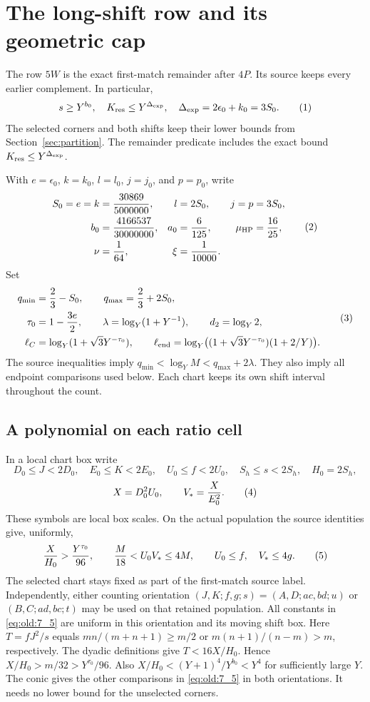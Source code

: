 \section{The long-shift row and its geometric cap}\label{sec:long}

The row \(5W\) is the exact first-match remainder after \(4P\). Its source
keeps every earlier complement. In particular,
\[
 s\ge Y^{b_0},\quad K_{\rm res}\le Y^{\Delta_{\rm exp}},\quad
 \Delta_{\rm exp}=2\epsilon_0+k_0=3S_0.
\AutoTag{eq:old:7_1}
\]
The selected corners and both shifts keep their lower bounds from
Section~\ref{sec:partition}. The remainder predicate includes the exact
bound \(K_{\rm res}\le Y^{\Delta_{\rm exp}}\).

With \(e=\epsilon_0\), \(k=k_0\), \(l=l_0\), \(j=j_0\), and \(p=p_0\), write
\[
\begin{aligned}
 S_0=e=k&=\frac{30869}{5000000},&
 l&=2S_0,& j=p&=3S_0,\\
 b_0&=\frac{4166537}{30000000},&
 a_0&=\frac6{125},&
 \mu_{\rm HP}&=\frac{16}{25},\\
 \nu&=\frac1{64},&
 \xi&=\frac1{10000}.
\end{aligned}
\AutoTag{eq:old:7_2}
\]
Set
\[
 \begin{aligned}
 q_{\min}&=\frac23-S_0,\qquad q_{\max}=\frac23+2S_0,\\
 \tau_0&=1-\frac{3e}{2},\qquad
 \lambda=\log_Y(1+Y^{-1}),\qquad d_2=\log_Y2,\\
 \ell_C&=\log_Y(1+\sqrt3Y^{-\tau_0}),\qquad
 \ell_{\rm end}=\log_Y\bigl((1+\sqrt3Y^{-\tau_0})(1+2/Y)\bigr).
 \end{aligned}
\AutoTag{eq:old:7_3}
\]
The source inequalities imply \(q_{\min}<\log_Y M<q_{\max}+2\lambda\).
They also imply all endpoint comparisons used below. Each chart keeps its
own shift interval throughout the count.

\subsection{A polynomial on each ratio cell}

In a local chart box write
\[
 D_0\le J<2D_0,\quad E_0\le K<2E_0,\quad
 U_0\le f<2U_0,\quad S_h\le s<2S_h,\quad H_0=2S_h,
\]
\[
 X=D_0^2U_0,\qquad V_*=\frac{X}{E_0^2}.
\AutoTag{eq:old:7_4}
\]
These symbols are local box scales. On the actual population the source
identities give, uniformly,
\[
 \frac{X}{H_0}>\frac{Y^{\tau_0}}{96},\qquad
 \frac M{18}<U_0V_*\le4M,\qquad
 U_0\le f,\quad V_*\le4g.
\AutoTag{eq:old:7_5}
\]
The selected chart stays fixed as part of the first-match source label.
Independently, either counting orientation
\((J,K;f,g;s)=(A,D;ac,bd;u)\) or \((B,C;ad,bc;t)\) may be used
on that retained population. All constants in \eqref{eq:old:7_5} are
uniform in this orientation and its moving shift box.
Here \(T=fJ^2/s\) equals \(mn/(m+n+1)\ge m/2\) or
\(m(n+1)/(n-m)>m\), respectively. The dyadic definitions give
\(T<16X/H_0\). Hence \(X/H_0>m/32>Y^{\tau_0}/96\).
Also \(X/H_0<(Y+1)^4/Y^{b_0}<Y^4\) for sufficiently large \(Y\).
The conic gives the other comparisons in \eqref{eq:old:7_5} in
both orientations. It needs no lower bound for the unselected corners.


